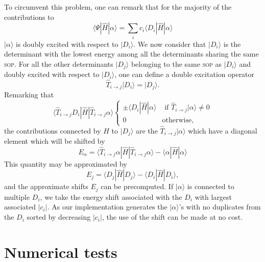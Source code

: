 \documentclass[aip,jcp,reprint,showkeys]{revtex4-1}
\newcommand{\ket}[1]{|#1\rangle}
\newcommand{\sop}{\textsc{sop}}
\newcommand{\mel}[3]{\langle #1 | #2 | #3 \rangle}
\begin{document}
To circumvent this problem, one can remark that for the majority of the
contributions to
\begin{equation}
 \mel{\Psi}{\hat{H}}{\alpha} = \sum_i c_i \mel{D_i}{\hat{H}}{\alpha}
\end{equation}
$\ket{\alpha}$ is doubly excited with respect to $\ket{D_i}$.
We now consider that $\ket{D_i}$ is the determinant with the lowest
energy among all the determinants sharing the same \sop .
For all the other determinants $\ket{D_j}$ belonging to the same \sop{}
as $\ket{D_i}$ and doubly excited with respect to $\ket{D_i}$, one can define
a double excitation operator
\begin{equation}
\hat{T}_{i\rightarrow j} \ket{D_i} = \ket{D_j}.
\end{equation}
Remarking that 
\begin{equation}
\mel{\hat{T}_{i\rightarrow j} D_i}{\hat{H}}{\hat{T}_{i\rightarrow j} \alpha} 
\begin{cases}
\pm \mel{D_i}{\hat{H}}{\alpha} & \text{ if } \hat{T}_{i\rightarrow j}\ket{\alpha} \ne 0 \\
0 & \text{otherwise},
\end{cases}
\end{equation}
the contributions connected by $\hat{H}$ to $\ket{D_j}$ are the
$\hat{T}_{i\rightarrow j} \ket{\alpha}$ which have a diagonal element which
will be shifted by 
\begin{equation}
E_\alpha = \langle \hat{T}_{i\rightarrow j} \alpha | \hat{H} | \hat{T}_{i\rightarrow j} \alpha \rangle - \langle \alpha | \hat{H} | \alpha \rangle
\end{equation}
This quantity may be approximated by
\begin{equation}
E_j = \langle D_j | \hat{H} | D_j \rangle - \langle D_i | \hat{H} | D_i \rangle,
\end{equation}
and the approximate shifts $E_j$ can be precomputed.
If $\ket{\alpha}$ is connected to multiple $D_i$, we take the energy shift
associated with the $D_i$ with largest associated $|c_i|$.
As our implementation generates the $\ket{\alpha}$'s with no duplicates
from the $D_i$ sorted by decreasing $|c_i|$, the use of the shift can
be made at no cost.





\section{Numerical tests}
\end{document}
